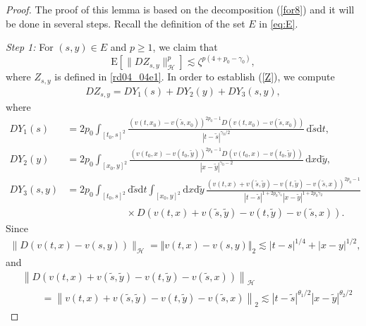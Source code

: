 \documentclass[10pt,a4paper]{amsart}
\newcommand {\deltah}{{\zeta}}
\newcommand{\E}{\mathrm{E}}
\renewcommand{\d}{\mathrm{d}}
\begin{document}
 \begin{proof} The proof of this lemma is based on the decomposition (\ref{for8}) and it will be done in several steps. Recall the definition of the set $E$ in \eqref{eq:E}.
 
 \medskip
 \noindent
 {\it Step 1:}
            For $(s,y)\in E$ and $p\geq1$,  we claim that
            \begin{equation} \label{Z}
             \E\left[\|DZ_{s,y}\|_{\mathcal{H}}^p \right] \lesssim \deltah^{p(4+p_0-\gamma_0)},
           \end{equation}
 where $Z_{s,y}$ is defined in \eqref{rd04_04e1}.  In order to establish (\ref{Z}), we compute 
           \begin{align}\label{eq:sum123}
           DZ_{s,y} = DY_1(s) + DY_2(y) + DY_3(s,y),
           \end{align}
           where
\begin{align*}
           DY_1(s) &= 2p_0\int_{[t_0, s]^2} \frac{(v(t,x_0)-v(\tilde{s},x_0))^{2p_0-1} D(v(t,x_0)-v(\tilde{s},x_0))}{|t-\tilde{s}|^{\gamma_0/2}}  \, \d \tilde{s} \d t,\\[6pt]
           DY_2(y)&=2p_0\int_{[x_0, y]^2} \frac {(v(t_0,x)-v(t_0,\tilde{y}))^{2p_0-1}  D\left(
           v(t_0,x)-v(t_0,\tilde{y})
           \right)}{|x-\tilde{y}|^{\gamma_0-2} }\, \d x\d \tilde{y},\\[6pt]
            DY_3(s,y)&=2p_0\int_{[t_0, s]^2}\d \tilde{s}\d t \int_{[x_0, y]^2} \d x\d \tilde{y} \, 
             \frac {(v(t,x)+v(\tilde{s},\tilde{y})-v(t,\tilde{y})-v(\tilde{s},x))^{2p_0-1}
            }{|t-\tilde{s}|^{1+2p_0\gamma_1}|x-\tilde{y}|^{1+2p_0\gamma_2}}\\
                       &  \qquad\qquad\qquad \times D\left(v(t,x)+v(\tilde{s},\tilde{y})-v(t,\tilde{y})-v(\tilde{s},x)\right).
\end{align*}
Since
\begin{align}
           \|D\left(v(t,x)-v(s,y)\right)\|_{\mathcal{H}} =
                      \Vert v(t, x) - v(s, y) \Vert_{2}  \lesssim |t-s|^{1/4}+|x-y|^{1/2},
\label{eq:increment2}           
\end{align}
and
           \begin{align}\label{eq:rect2}
           &\left\|D\left(v(t,x)+v(\tilde{s},\tilde{y})-v(t,\tilde{y})-v(\tilde{s},x)\right)  \right\|_{\mathcal{H}}\nonumber\\
           &\qquad=\left\|v(t,x)+v(\tilde{s},\tilde{y})-v(t,\tilde{y})-v(\tilde{s},x) \right\|_{2}
            \lesssim |t-\tilde{s}|^{\theta_1/2}|x-\tilde{y}|^{\theta_2/2}

\end{align}
\end{proof}
\end{document}
